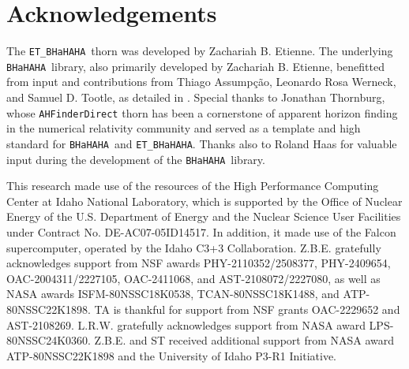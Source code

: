 \documentclass[a4paper,11pt]{article}
\newcommand{\thorn}[1]{{\tt #1}}
\newcommand{\BHaHAHA}{\thorn{ET\_BHaHAHA}} %
\newcommand{\bhahlib}{\texttt{BHaHAHA}} %
\begin{document}
\section{Acknowledgements}
\label{sec:acknowledgements}
The \BHaHAHA\ thorn was developed by Zachariah B. Etienne.
The underlying \bhahlib\ library, also primarily developed by Zachariah B. Etienne, benefitted from input and contributions from Thiago Assump\c{c}\~{a}o, Leonardo Rosa Werneck, and Samuel D. Tootle, as detailed in \cite{Etienne2025etal}.
Special thanks to Jonathan Thornburg, whose \thorn{AHFinderDirect} thorn has been a cornerstone of apparent horizon finding in the numerical relativity community and served as a template and high standard for \bhahlib\ and \BHaHAHA. Thanks also to Roland Haas for valuable input during the development of the \bhahlib\ library.

This research made use of the resources of the High Performance Computing Center at Idaho National Laboratory, which is supported by the Office of Nuclear Energy of the U.S. Department of Energy and the Nuclear Science User Facilities under Contract No. DE-AC07-05ID14517. In addition, it made use of the Falcon supercomputer, operated by the Idaho C3+3 Collaboration.
Z.B.E. gratefully acknowledges support from NSF awards PHY-2110352/2508377, PHY-2409654, OAC-2004311/2227105, OAC-2411068, and AST-2108072/2227080, as well as NASA awards ISFM-80NSSC18K0538, TCAN-80NSSC18K1488, and ATP-80NSSC22K1898. TA is thankful for support from NSF grants OAC-2229652 and AST-2108269. L.R.W. gratefully acknowledges support from NASA award LPS-80NSSC24K0360. Z.B.E. and ST received additional support from NASA award ATP-80NSSC22K1898 and the University of Idaho P3-R1 Initiative.
\end{document}
